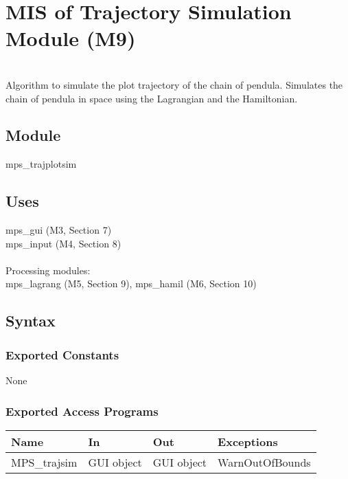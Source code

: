 \documentclass[12pt, titlepage]{article}
\begin{document}
\section{MIS of Trajectory Simulation Module (M9)} \label{Module} 


\\

Algorithm to simulate the plot trajectory of the chain of pendula.
Simulates the chain of pendula in space using the Lagrangian
and the Hamiltonian.

\subsection{Module}

mps\_trajplotsim

\subsection{Uses}

mps\_gui (M3, Section 7)\\
mps\_input (M4, Section 8)\\\\
Processing modules:\\
mps\_lagrang (M5, Section 9), mps\_hamil (M6, Section 10)\\

\subsection{Syntax}

\subsubsection{Exported Constants}

None

\subsubsection{Exported Access Programs}

\begin{center}
\begin{tabular}{p{2cm} p{4cm} p{4cm} p{2cm}}
\hline
\textbf{Name} & \textbf{In} & \textbf{Out} & \textbf{Exceptions} \\
\hline
MPS\_trajsim & GUI object & GUI object & WarnOutOfBounds \\
\hline
\end{tabular}
\end{center}
\end{document}
